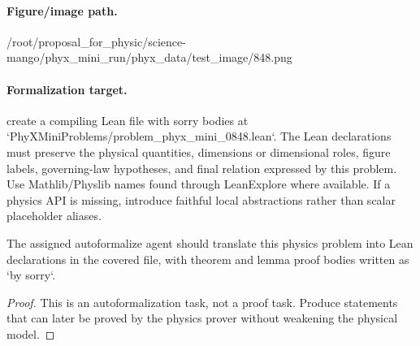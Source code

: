 \paragraph{Figure/image path.}
/root/proposal\_for\_physic/science-mango/phyx\_mini\_run/phyx\_data/test\_image/848.png

\paragraph{Formalization target.}
create a compiling Lean file with sorry bodies at `PhyXMiniProblems/problem\_phyx\_mini\_0848.lean`. The Lean declarations must preserve the physical quantities, dimensions or dimensional roles, figure labels, governing-law hypotheses, and final relation expressed by this problem.
Use Mathlib/Physlib names found through LeanExplore where available. If a physics API is missing, introduce faithful local abstractions rather than scalar placeholder aliases.

\begin{theorem}
\label{thm:physics:phyx_mini_0848:target}
The assigned autoformalize agent should translate this physics problem into Lean declarations in the covered file, with theorem and lemma proof bodies written as `by sorry`.
\end{theorem}
\begin{proof}
This is an autoformalization task, not a proof task. Produce statements that can later be proved by the physics prover without weakening the physical model.
\end{proof}

